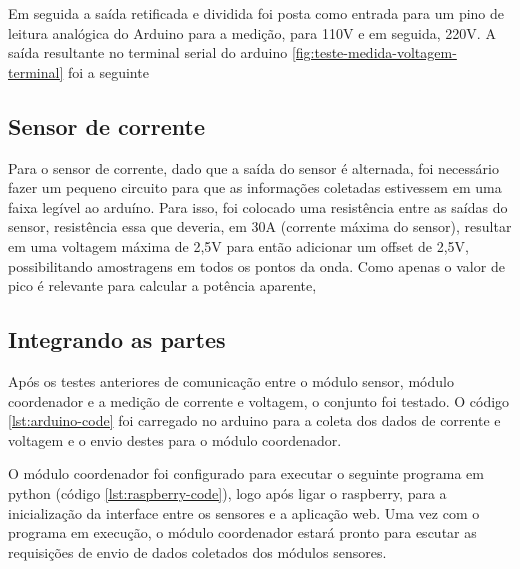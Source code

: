 
Em seguida a saída retificada e dividida foi posta como entrada para um pino de leitura analógica do Arduino para a medição, para 110V e em seguida, 220V. A saída resultante no terminal serial do arduino \ref{fig:teste-medida-voltagem-terminal} foi a seguinte


\subsection{Sensor de corrente}

Para o sensor de corrente, dado que a saída do sensor é alternada, foi necessário fazer um pequeno circuito para que as informações coletadas estivessem em uma faixa legível ao arduíno. Para isso, foi colocado uma resistência entre as saídas do sensor, resistência essa que deveria, em 30A (corrente máxima do sensor), resultar em uma voltagem máxima de 2,5V para então adicionar um offset de 2,5V, possibilitando amostragens em todos os pontos da onda. Como apenas o valor de pico é relevante para calcular a potência aparente, 


\subsection{Integrando as partes}

Após os testes anteriores de comunicação entre o módulo sensor, módulo coordenador e a medição de corrente e voltagem, o conjunto foi testado. O código \ref{lst:arduino-code} foi carregado no arduino para a coleta dos dados de corrente e voltagem e o envio destes para o módulo coordenador.



O módulo coordenador foi configurado para executar o seguinte programa em python (código \ref{lst:raspberry-code}), logo após ligar o raspberry, para a inicialização da interface entre os sensores e a aplicação web. Uma vez com o programa em execução, o módulo coordenador estará pronto para escutar as requisições de envio de dados coletados dos módulos sensores. 



